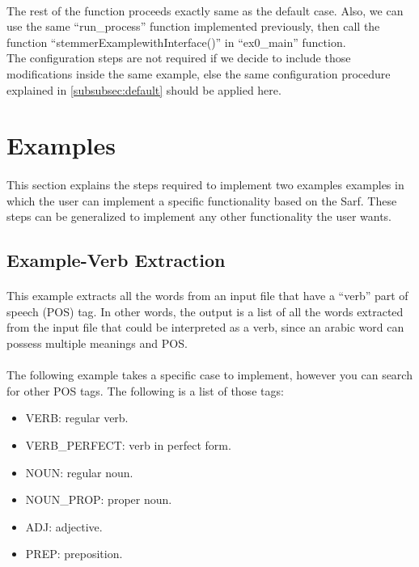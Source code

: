 \documentclass{article}
\begin{document}
\paragraph{}
The rest of the function proceeds exactly same as the default case. Also, we can use the same ``run\_process'' function implemented previously, then call the function ``stemmerExamplewithInterface()'' in ``ex0\_main'' function.\\
The configuration steps are not required if we decide to include those modifications inside the same example, else the same configuration procedure explained in \ref{subsubsec:default} should be applied here.

\section{Examples}
\label{sec:examples}
\paragraph{}
This section explains the steps required to implement two examples examples in which the user can implement a specific functionality based on the Sarf. These steps can be generalized to implement any other functionality the user wants.

\subsection{Example-Verb Extraction}
\paragraph{}
This example extracts all the words from an input file that have a ``verb'' part of speech (POS) tag. In other words, the output is a list of all the words extracted from the input file that could be interpreted as a verb, since an arabic word can possess multiple meanings and POS.

\paragraph{}
The following example takes a specific case to implement, however you can search for other POS tags. The following is a list of those tags:
\begin{itemize}
\item VERB: regular verb.
\item VERB\_PERFECT: verb in perfect form.
\item NOUN: regular noun.
\item NOUN\_PROP: proper noun.
\item ADJ: adjective.
\item PREP: preposition.
\end{itemize}
\end{document}
